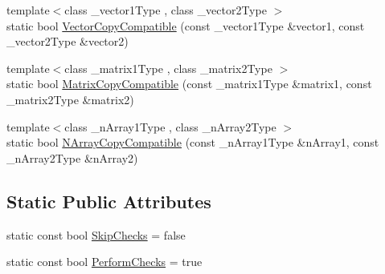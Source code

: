 \begin{DoxyCompactItemize}
\item 
{\footnotesize template$<$class \+\_\+vector1\+Type , class \+\_\+vector2\+Type $>$ }\\static bool \hyperlink{classvct_fast_copy_aa1da9b44b0f868dccb51cc804132e8f0}{Vector\+Copy\+Compatible} (const \+\_\+vector1\+Type \&vector1, const \+\_\+vector2\+Type \&vector2)
\item 
{\footnotesize template$<$class \+\_\+matrix1\+Type , class \+\_\+matrix2\+Type $>$ }\\static bool \hyperlink{classvct_fast_copy_a7139a17496805c6cf30b7b45d55c63cb}{Matrix\+Copy\+Compatible} (const \+\_\+matrix1\+Type \&matrix1, const \+\_\+matrix2\+Type \&matrix2)
\item 
{\footnotesize template$<$class \+\_\+n\+Array1\+Type , class \+\_\+n\+Array2\+Type $>$ }\\static bool \hyperlink{classvct_fast_copy_a4f5220d0ae7271941acea5a622dd0407}{N\+Array\+Copy\+Compatible} (const \+\_\+n\+Array1\+Type \&n\+Array1, const \+\_\+n\+Array2\+Type \&n\+Array2)
\end{DoxyCompactItemize}

\subsection*{Static Public Attributes}
{\bf }\par
\begin{DoxyCompactItemize}
\item 
static const bool \hyperlink{classvct_fast_copy_a221c1b0117c8dcf51332ad84f4e0fda5}{Skip\+Checks} = false
\item 
static const bool \hyperlink{classvct_fast_copy_af2981ae09904d1a4dd9b2d19c86c6cd9}{Perform\+Checks} = true
\end{DoxyCompactItemize}

